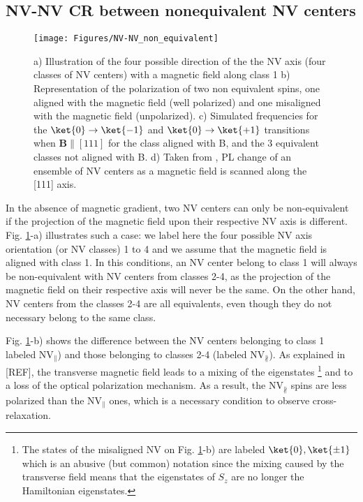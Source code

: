 \documentclass[a4paper,11pt]{report}
\begin{document}
\subsection{NV-NV CR between nonequivalent NV centers}
\label{non_equi_valent_CR}
\begin{figure}[h]
\centering
\texttt{[image: Figures/NV-NV\_non\_equivalent]}
\caption{a) Illustration of the four possible direction of the the NV axis (four classes of NV centers) with a magnetic field along class 1 b) Representation of the polarization of two non equivalent spins, one aligned with the magnetic field (well polarized) and one misaligned with the magnetic field (unpolarized). c) Simulated frequencies for the $\ket{0} \to \ket{-1}$ and $\ket{0} \to \ket{+1}$ transitions when $\mathbf{B}\parallel [111]$ for the class aligned with B, and the 3 equivalent classes not aligned with B. d) Taken from \citep{armstrong2010nv}, PL change of an ensemble of NV centers as a magnetic field is scanned along the [111] axis.}
\label{non-equivalent NV-NV}
\end{figure}

In the absence of magnetic gradient, two NV centers can only be non-equivalent if the projection of the magnetic field upon their respective NV axis is different. Fig. \ref{non-equivalent NV-NV}-a) illustrates such a case: we label here the four possible NV axis orientation (or NV classes) 1 to 4 and we assume that the magnetic field is aligned with class 1. In this conditions, an NV center belong to class 1 will always be non-equivalent with NV centers from classes 2-4, as the projection of the magnetic field on their respective axis will never be the same. On the other hand, NV centers from the classes 2-4 are all equivalents, even though they do not necessary belong to the same class.

Fig. \ref{non-equivalent NV-NV}-b) shows the difference between the NV centers belonging to class 1 labeled NV$_\parallel$) and those belonging to classes 2-4 (labeled NV$_\nparallel$). As explained in [REF], the transverse magnetic field leads to a mixing of the eigenstates \footnote{The states of the misaligned NV on Fig. \ref{non-equivalent NV-NV}-b) are labeled $\ket{0},\ket{\pm 1}$ which is an abusive (but common) notation since the mixing caused by the transverse field means that the eigenstates of $S_z$ are no longer the Hamiltonian eigenstates.} and to a loss of the optical polarization mechanism. As a result, the NV$_\nparallel$ spins are less polarized than the NV$_\parallel$ ones, which is a necessary condition to observe cross-relaxation.
\end{document}
